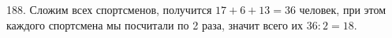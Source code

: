 188. Сложим всех спортсменов, получится $17+6+13=36$ человек, при этом каждого спортсмена мы посчитали по 2 раза, значит всего их $36:2=18.$\\
